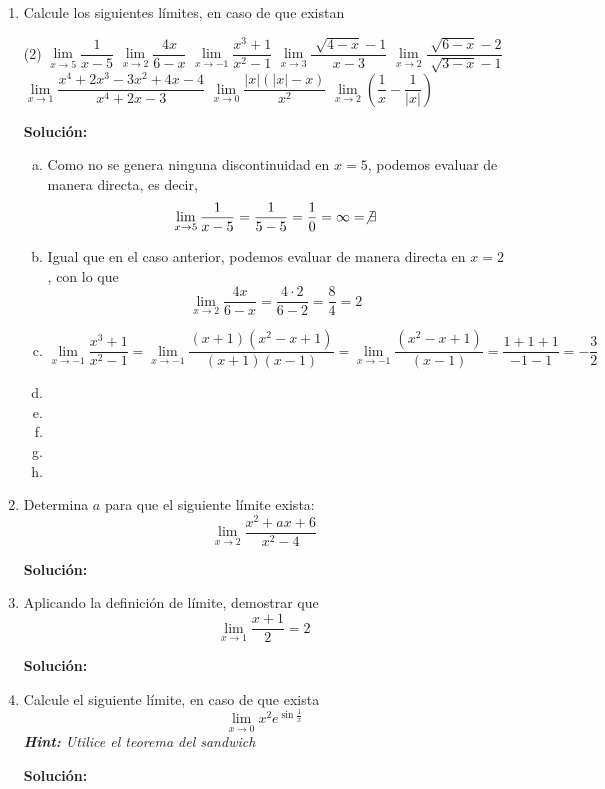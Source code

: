 \documentclass[12pt]{article}
\newenvironment{solucion}
{\begin{mdframed}[backgroundcolor=black!10]
		{\bf Solución:}\\
	}
	{
	\end{mdframed}
}
\newenvironment{preguntas}
{\begin{enumerate}\itemsep12pt
	}
	{
	\end{enumerate}
}
\newcommand{\ra}{\rightarrow}
\begin{document}
\begin{preguntas}
\item Calcule los siguientes límites, en caso de que existan
\begin{tasks}(2)
\task $\lim\limits_{x \ra 5} \dfrac{1}{x-5}$ 
\task $\lim\limits_{x \ra 2} \dfrac{4x}{6-x}$
\task $\lim\limits_{x \ra -1} \dfrac{x^3+1}{x^2-1}$
\task $\lim\limits_{x \ra 3} \dfrac{\sqrt[]{4-x}-1}{x-3}$
\task $\lim\limits_{x \ra 2} \dfrac{\sqrt[]{6-x}-2}{\sqrt[]{3-x}-1}$
\task $\lim\limits_{x \ra 1} \dfrac{x^4+2x^3-3x^2+4x-4}{x^4+2x-3}$
\task $\lim\limits_{x \ra 0} \dfrac{|x|(|x|-x)}{x^2}$
\task $\lim\limits_{x \ra 2}\left(\dfrac{1}{x}-\dfrac{1}{|x|}\right)$
\end{tasks}
\begin{solucion}

\begin{enumerate}[a)]
\item Como no se genera ninguna discontinuidad en $x = 5$, podemos evaluar de manera directa, es decir,
$$\lim\limits_{x \ra 5} \dfrac{1}{x-5} = \dfrac{1}{5-5} = \dfrac{1}{0} = \infty = \not\exists$$
\item Igual que en el caso anterior, podemos evaluar de manera directa en $x = 2$, con lo que
$$\lim\limits_{x \ra 2} \dfrac{4x}{6-x} = \dfrac{4 \cdot 2}{6-2} = \dfrac{8}{4} = 2$$
\item $\lim\limits_{x \ra -1} \dfrac{x^3+1}{x^2-1} = \lim\limits_{x \ra -1} \dfrac{(x+1)(x^2-x+1)}{(x+1)(x-1)} = \lim\limits_{x \ra -1} \dfrac{(x^2-x+1)}{(x-1)} = \dfrac{1 + 1 + 1}{-1 -1} = -\dfrac{3}{2}$
\item 
\item 
\item 
\item 
\item 
\end{enumerate}
\end{solucion}
\item Determina $a$ para que el siguiente límite exista:
$$ \lim\limits_{x \ra 2} \dfrac{x^2+ax+6}{x^2-4} $$
\begin{solucion}

\end{solucion}
\item Aplicando la definición de límite, demostrar que
$$\lim\limits_{x \ra 1} \dfrac{x+1}{2} = 2$$
\begin{solucion}

\end{solucion}
\item Calcule el siguiente límite, en caso de que exista
$$ \lim\limits_{x \ra 0} x^2e^{\sin{\frac{1}{x}}} $$
\textit{\textbf{Hint:} Utilice el teorema del sandwich}
\begin{solucion}

\end{solucion}
\end{preguntas}
\end{document}
